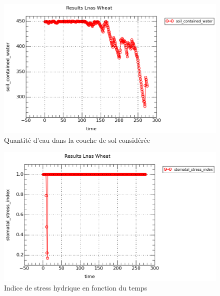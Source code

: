\begin{figure}

\begin{center}
 \includegraphics[scale = 0.5]{./img/water.png}
 \caption{Quantité d'eau dans la couche de sol considérée}
 \label{fig:resultatWater}
\end{center}
\end{figure}

\begin{figure}

\begin{center}
 \includegraphics[scale = 0.5]{./img/waterStress.png}
 \caption{Indice de stress hydrique en fonction du temps}
 \label{fig:resultatStressH}
\end{center}

\end{figure}

